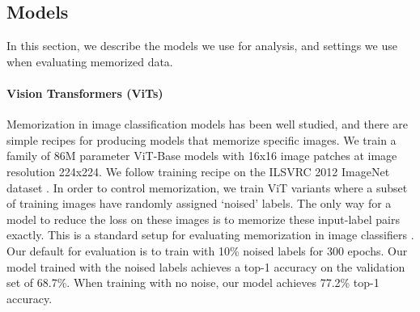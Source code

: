 \documentclass{article} %
\begin{document}
\subsection{Models}
In this section, we describe the models we use for analysis, and settings we use when evaluating memorized data.

\paragraph{Vision Transformers (ViTs)}
Memorization in image classification models has been well studied, and there are simple recipes for producing models that memorize specific images. We train a family of 86M parameter ViT-Base models \citep{dosovitskiy2020image} with 16x16 image patches at image resolution 224x224. We follow \citet{dosovitskiy2020image} training recipe on the ILSVRC 2012 ImageNet dataset \citep{russakovsky2015imagenet}. In order to control memorization, we train ViT variants where a subset of training images have randomly assigned `noised' labels. The only way for a model to reduce the loss on these images is to memorize these input-label pairs exactly. This is a standard setup for evaluating memorization in image classifiers \citep{zhang2017understanding}. Our default for evaluation is to train with 10\% noised labels for 300 epochs. Our model trained with the noised labels achieves a top-1 accuracy on the validation set of 68.7\%. When training with no noise, our model achieves 77.2\% top-1 accuracy.
\end{document}
